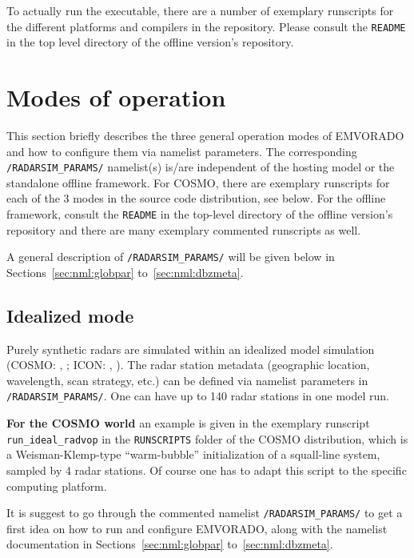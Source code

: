 \documentclass[10pt,a4paper,twoside,headinclude,footinclude,parskip=half]{scrartcl}
\newcommand{\myaktuellesection}{sec:intro}%
\newcommand{\labelsec}[1]{\label{#1}\renewcommand{\myaktuellesection}{#1}}%
\newcommand{\labelsec}[1]{\label{#1}}%
\newcommand{\citeNPK}[1]{\citeauthor{#1}, \citeyear{#1}}
\newcommand{\srcform}[1]{\mbox{\texttt{#1}}\xspace}%
\begin{document}
To actually run the executable, there are a number of exemplary runscripts for the different platforms and compilers in the repository. Please consult the \verb|README| in the top level directory of the offline version's repository.



\section{Modes of operation}

\labelsec{sec:modes}

This section briefly describes the three general operation modes of EMVORADO and how to configure them
via namelist parameters. The corresponding \srcform{/RADARSIM_PARAMS/} namelist(s) is/are independent of the hosting model or the standalone offline framework.
For COSMO, there are exemplary runscripts for each of the 3 modes in the source code distribution, see below. For the offline framework, consult the
\verb|README| in the top-level directory of the offline version's repository and there are many exemplary commented runscripts as well.

A general description of \srcform{/RADARSIM_PARAMS/} will be given below in Sections~\ref{sec:nml:globpar} to~\ref{sec:nml:dbzmeta}.

\subsection{Idealized mode}

\labelsec{sec:modei}

Purely synthetic radars are simulated within an idealized model simulation (COSMO: \citeNPK{blahak2015b}; ICON: \citeNPK{icontutorial2020}).
The radar station metadata (geographic location, wavelength,
scan strategy, etc.) can be defined via namelist parameters in \srcform{/RADARSIM_PARAMS/}.
One can have up to 140 radar stations in one model run.

\textbf{For the COSMO world} an example is given in the exemplary runscript \srcform{run_ideal_radvop} in the
\srcform{RUNSCRIPTS} folder of the COSMO distribution, which is a Weisman-Klemp-type
``warm-bubble'' initialization of a squall-line system, sampled by
4 radar stations. Of course one has to adapt this script
to the specific computing platform.

It is suggest to go through the commented namelist \srcform{/RADARSIM_PARAMS/}
to get a first idea on how to run and configure EMVORADO, along with the namelist documentation
in Sections~\ref{sec:nml:globpar} to~\ref{sec:nml:dbzmeta}.
\end{document}
